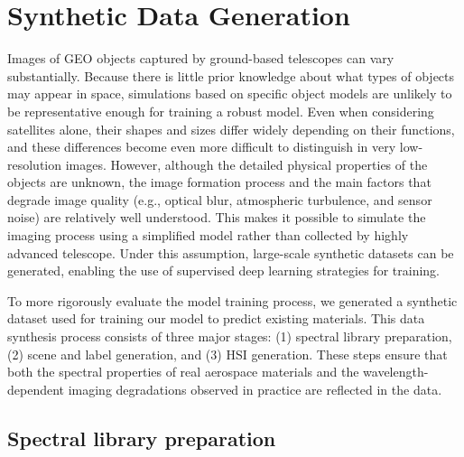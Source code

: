 \documentclass[12pt]{elsarticle}
\begin{document}
\section{Synthetic Data Generation}

Images of GEO objects captured by ground-based telescopes can vary substantially. 
Because there is little prior knowledge about what types of objects may appear in space, simulations based on specific object models are unlikely to be representative enough for training a robust model. 
Even when considering satellites alone, their shapes and sizes differ widely depending on their functions, and these differences become even more difficult to distinguish in very low-resolution images. 
However, although the detailed physical properties of the objects are unknown, the image formation process and the main factors that degrade image quality (e.g., optical blur, atmospheric turbulence, and sensor noise) are relatively well understood. 
This makes it possible to simulate the imaging process using a simplified model rather than collected by highly advanced telescope. Under this assumption, large-scale synthetic datasets can be generated, enabling the use of supervised deep learning strategies for training.

To more rigorously evaluate the model training process, we generated a synthetic dataset used for training our model to predict existing materials. This data synthesis process consists of three major stages: (1) spectral library preparation, (2) scene and label generation, and (3) HSI generation. These steps ensure that both the spectral properties of real aerospace materials and the wavelength-dependent imaging degradations observed in practice are reflected in the data.


\subsection{Spectral library preparation}
\end{document}
